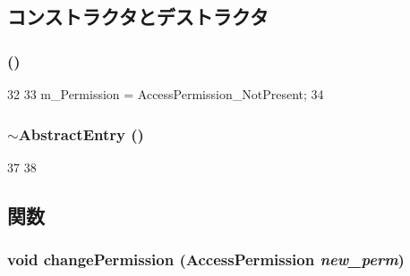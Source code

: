 \subsection{コンストラクタとデストラクタ}
\hypertarget{classAbstractEntry_ad75be01d4fce1bd2ce3e7eb247ba40a3}{
\subsubsection[{AbstractEntry}]{ ()}}
\label{classAbstractEntry_ad75be01d4fce1bd2ce3e7eb247ba40a3}



\begin{DoxyCode}
32 {
33     m_Permission = AccessPermission_NotPresent;
34 }
\end{DoxyCode}
\hypertarget{classAbstractEntry_aa17a28f91e67d9936834d333e9c29524}{
\subsubsection[{$\sim$AbstractEntry}]{\setlength{\rightskip}{0pt plus 5cm}$\sim${\bf AbstractEntry} ()}}
\label{classAbstractEntry_aa17a28f91e67d9936834d333e9c29524}



\begin{DoxyCode}
37 {
38 }
\end{DoxyCode}


\subsection{関数}
\hypertarget{classAbstractEntry_ac3f081af818286da737aac954875dd19}{
\subsubsection[{changePermission}]{\setlength{\rightskip}{0pt plus 5cm}void changePermission (AccessPermission {\em new\_\-perm})}}
\label{classAbstractEntry_ac3f081af818286da737aac954875dd19}


